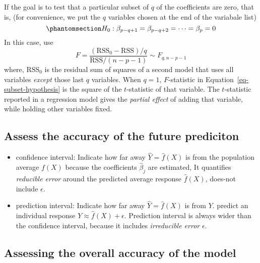 \documentclass[
  letterpaper,
  DIV=11,
  numbers=noendperiod]{scrreprt}
\begin{document}
If the goal is to test that a particular subset of \(q\) of the
coefficients are zero, that is, (for convenience, we put the \(q\)
variables chosen at the end of the variabale list)
\begin{equation}\phantomsection\label{eq-subset-hypothesis}{
H_0: \beta_{p-q+1} = \beta_{p-q+2}=\cdots = \beta_p=0
}\end{equation} In this case, use \[
F = \frac{(\text{RSS}_0-\text{RSS})/q}{\text{RSS}/(n-p-1)}\sim F_{q,n-p-1}
\] where, \(\text{RSS}_0\) is the residual sum of squares of a second
model that uses all variables \emph{except} those last \(q\) variables.
When \(q=1\), \(F\)-statistic in Equation~\ref{eq-subset-hypothesis} is
the square of the \(t\)-statistic of that variable. The \(t\)-statistic
reported in a regression model gives the \emph{partial effect} of adding
that variable, while holding other variables fixed.

\subsection{Assess the accuracy of the future
prediciton}\label{assess-the-accuracy-of-the-future-prediciton}

\begin{itemize}
\item
  confidence interval: Indicate how far away \(\hat{Y}=\hat{f}(X)\) is
  from the population average \(f(X)\) because the coefficients
  \(\hat{\beta}_{j}\) are estimated, It quantifies \emph{reducible
  error} around the predicted average response \(\hat{f}(X)\), does-not
  include \(\epsilon\).
\item
  prediction interval: Indicate how far away \(\hat{Y}=\hat{f}(X)\) is
  from \(Y\). predict an individual response
  \(Y\approx \hat{f}(X)+\epsilon\). Prediction interval is always wider
  than the confidence interval, because it includes \emph{irreducible
  error} \(\epsilon\).
\end{itemize}

\subsection{Assessing the overall accuracy of the
model}\label{assessing-the-overall-accuracy-of-the-model}
\end{document}
